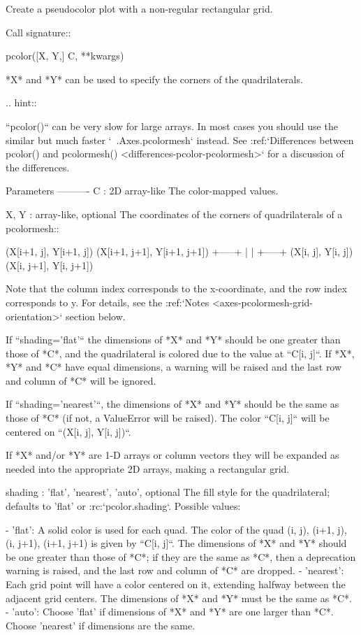 \begin{DoxyVerb}
\begin{DoxyVerb}Create a pseudocolor plot with a non-regular rectangular grid.

Call signature::

    pcolor([X, Y,] C, **kwargs)

*X* and *Y* can be used to specify the corners of the quadrilaterals.

.. hint::

    ``pcolor()`` can be very slow for large arrays. In most
    cases you should use the similar but much faster
    `~.Axes.pcolormesh` instead. See
    :ref:`Differences between pcolor() and pcolormesh()
    <differences-pcolor-pcolormesh>` for a discussion of the
    differences.

Parameters
----------
C : 2D array-like
    The color-mapped values.

X, Y : array-like, optional
    The coordinates of the corners of quadrilaterals of a pcolormesh::

(X[i+1, j], Y[i+1, j])       (X[i+1, j+1], Y[i+1, j+1])
                      +-----+
                      |     |
                      +-----+
    (X[i, j], Y[i, j])       (X[i, j+1], Y[i, j+1])

    Note that the column index corresponds to the x-coordinate, and
    the row index corresponds to y. For details, see the
    :ref:`Notes <axes-pcolormesh-grid-orientation>` section below.

    If ``shading='flat'`` the dimensions of *X* and *Y* should be one
    greater than those of *C*, and the quadrilateral is colored due
    to the value at ``C[i, j]``.  If *X*, *Y* and *C* have equal
    dimensions, a warning will be raised and the last row and column
    of *C* will be ignored.

    If ``shading='nearest'``, the dimensions of *X* and *Y* should be
    the same as those of *C* (if not, a ValueError will be raised). The
    color ``C[i, j]`` will be centered on ``(X[i, j], Y[i, j])``.

    If *X* and/or *Y* are 1-D arrays or column vectors they will be
    expanded as needed into the appropriate 2D arrays, making a
    rectangular grid.

shading : {'flat', 'nearest', 'auto'}, optional
    The fill style for the quadrilateral; defaults to 'flat' or
    :rc:`pcolor.shading`. Possible values:

    - 'flat': A solid color is used for each quad. The color of the
      quad (i, j), (i+1, j), (i, j+1), (i+1, j+1) is given by
      ``C[i, j]``. The dimensions of *X* and *Y* should be
      one greater than those of *C*; if they are the same as *C*,
      then a deprecation warning is raised, and the last row
      and column of *C* are dropped.
    - 'nearest': Each grid point will have a color centered on it,
      extending halfway between the adjacent grid centers.  The
      dimensions of *X* and *Y* must be the same as *C*.
    - 'auto': Choose 'flat' if dimensions of *X* and *Y* are one
      larger than *C*.  Choose 'nearest' if dimensions are the same.


\end{DoxyVerb}
\end{DoxyVerb}
